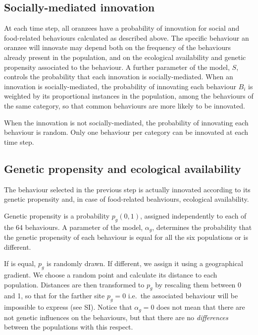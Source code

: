 \documentclass[9pt,twocolumn,twoside,]{pnas-new}
\begin{document}
\subsection*{Socially-mediated innovation}\label{format}

At each time step, all oranzees have a probability of innovation for
social and food-related behaviours calculated as described above. The
specific behaviour an oranzee will innovate may depend both on the
frequency of the behaviours already present in the population, and on
the ecological availability and genetic propensity associated to the
behaviour. A further parameter of the model, \(S\), controls the
probability that each innovation is socially-mediated. When an
innovation is socially-mediated, the probability of innovating each
behaviour \(B_i\) is weighted by its proportional instances in the
population, among the behaviours of the same category, so that common
behaviours are more likely to be innovated.

When the innovation is not socially-mediated, the probability of
innovating each behaviour is random. Only one behaviour per category can
be innovated at each time step.

\subsection*{Genetic propensity and ecological
availability}\label{format}

The behaviour selected in the previous step is actually innovated
according to its genetic propensity and, in case of food-related
beahviours, ecological availability.

Genetic propensity is a probability \(p_g(0,1)\), assigned independently
to each of the 64 behaviours. A parameter of the model, \(\alpha_g\),
determines the probability that the genetic propensity of each behaviour
is equal for all the six populations or is different.

If is equal, \(p_g\) is randomly drawn. If different, we assign it using
a geographical gradient. We choose a random point and calculate its
distance to each population. Distances are then transformed to \(p_g\)
by rescaling them between 0 and 1, so that for the farther site
\(p_g=0\) i.e.~the associated behaviour will be impossible to express
(see SI). Notice that \(\alpha_g=0\) does not mean that there are not
genetic influences on the behaviours, but that there are no
\emph{differences} between the populations with this respect.
\end{document}
